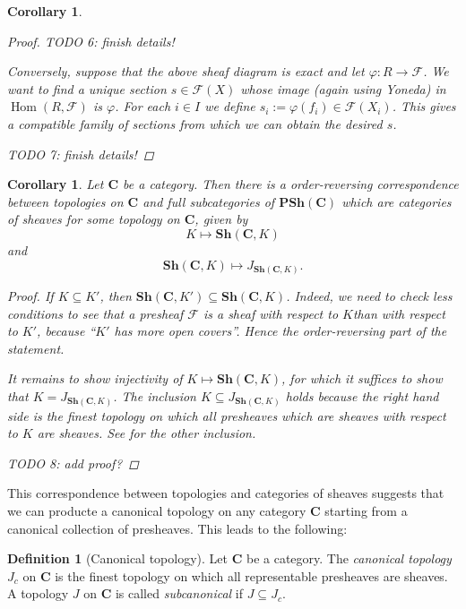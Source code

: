 \documentclass[12pt,reqno,a4paper]{amsart}
\theoremstyle{plain}
\newtheorem{cor}[thm]{Corollary}
\theoremstyle{definition}
\newtheorem{defn}[thm]{Definition}
\theoremstyle{remark}
\begin{document}
\begin{cor}
\begin{proof}
    {\color{red} TODO 6: finish details!}

    Conversely, suppose that the above sheaf diagram is exact and let $\varphi \colon R \to \mathscr{F}$.
    We want to find a unique section $s \in \mathscr{F}(X)$ whose image (again using Yoneda) in $\operatorname{Hom}(R,\mathscr{F})$ is $\varphi$.
    For each $i \in I$ we define $s_{i} := \varphi(f_{i}) \in \mathscr{F}(X_{i})$.
    This gives a compatible family of sections from which we can obtain the desired $s$.

    {\color{red} TODO 7: finish details!}

  \end{proof}
\end{cor}

\begin{cor}\label{cor:correspondence}
  Let $\mathbf{C}$ be a category.
  Then there is a order-reversing correspondence between topologies on $\mathbf{C}$ and full subcategories of $\mathbf{PSh}(\mathbf{C})$ which are categories of sheaves for some topology on $\mathbf{C}$, given by
  \[ K \mapsto \mathbf{Sh}(\mathbf{C},K) \]
  and
  \[ \mathbf{Sh}(\mathbf{C},K) \mapsto J_{\mathbf{Sh}(\mathbf{C},K)}. \]
  \begin{proof}
    If $K \subseteq K'$, then $\mathbf{Sh}(\mathbf{C},K') \subseteq \mathbf{Sh}(\mathbf{C},K)$.
    Indeed, we need to check less conditions to see that a presheaf $\mathscr{F}$ is a sheaf with respect to $K$than with respect to $K'$, because ``$K'$ has more open covers''.
    Hence the order-reversing part of the statement.

    It remains to show injectivity of $K \mapsto \mathbf{Sh}(\mathbf{C},K)$, for which it suffices to show that $K = J_{\mathbf{Sh}(\mathbf{C},K)}$.
    The inclusion $K \subseteq J_{\mathbf{Sh}(\mathbf{C},K)}$ holds because the right hand side is the finest topology on which all presheaves which are sheaves with respect to $K$ are sheaves.
    See \cite[\href{https://stacks.math.columbia.edu/tag/00ZP}{Tag 00ZP}]{stacks-project} for the other inclusion.

    {\color{red} TODO 8: add proof?}
  \end{proof}
\end{cor}

This correspondence between topologies and categories of sheaves suggests that we can producte a canonical topology on any category $\mathbf{C}$ starting from a canonical collection of presheaves.
This leads to the following:

\begin{defn}[Canonical topology]
  Let $\mathbf{C}$ be a category.
  The \textit{canonical topology} $J_{c}$ on $\mathbf{C}$ is the finest topology on which all representable presheaves are sheaves.
  A topology $J$ on $\mathbf{C}$ is called \textit{subcanonical} if $J \subseteq J_{c}$.
\end{defn}
\end{document}

